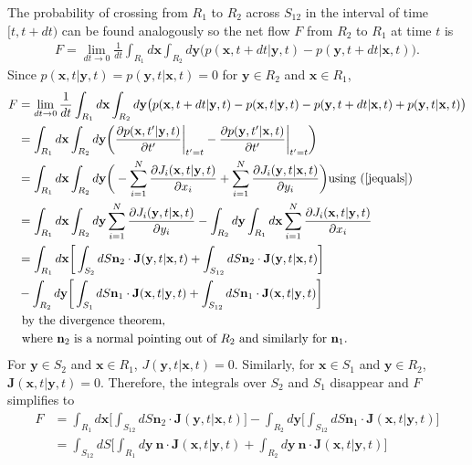 \documentclass{article}
\newcommand{\mb}{\mathbf}
\begin{document}
\begin{pf}
The probability of crossing from $R_1$ to $R_2$ across $S_{12}$  in the interval of time $[t,t+dt)$ can be found analogously so the net flow $F$ from $R_2$ to $R_1$ at time $t$ is 
\begin{align*}
F=\lim_{dt \to 0}\frac{1}{dt}\int_{R_1}d{\mb x}\int_{R_2}d{\mb y} \big(p({\mb x},t+dt|{\mb y},t)-p({\mb y},t+dt|{\mb x},t)\big).
\end{align*}
Since $p({\mb x},t|{\mb y},t)=p({\mb y},t|{\mb x},t)=0$ for ${\mb y}\in R_2$ and ${\mb x}\in R_1$,
\begin{align*}
F&=\lim_{dt \to 0}\frac{1}{dt}\int_{R_1}d{\mb x}\int_{R_2}d{\mb y} \big(p({\mb x},t+dt|{\mb y},t)-p({\mb x},t|{\mb y},t)-p({\mb y},t+dt|{\mb x},t)+p({\mb y},t|{\mb x},t)\big)
\\&=\int_{R_1}d{\mb x}\int_{R_2}d{\mb y} \bigg(\frac{\partial p({\mb x},t'|{\mb y},t)}{\partial t'}\bigg|_{t'=t}-\frac{\partial p({\mb y},t'|{\mb x},t)}{\partial t'}\bigg|_{t'=t}\bigg)
\\&=\int_{R_1}d{\mb x}\int_{R_2}d{\mb y}\bigg(-\sum_{i=1}^N\frac{\partial J_i({\mb x},t|{\mb y},t)}{\partial x_i}+\sum_{i=1}^N\frac{\partial J_i({\mb y},t|{\mb x},t)}{\partial y_i}\bigg) \text{using (\ref{jequals})}
\\&=\int_{R_1}d{\mb x}\int_{R_2}d{\mb y}\sum_{i=1}^N\frac{\partial J_i({\mb y},t|{\mb x},t)}{\partial y_i}-\int_{R_2}d{\mb y}\int_{R_1}d{\mb x}\sum_{i=1}^N\frac{\partial J_i({\mb x},t|{\mb y},t)}{\partial x_i}
\\&=\int_{R_1}d{\mb x}\bigg[\int_{S_2}dS {\mb n_2}\cdot {\mb J}({\mb y},t|{\mb x},t)+\int_{S_{12}}dS {\mb n_2}\cdot {\mb J}({\mb y},t|{\mb x},t)\bigg]\\&-\int_{R_2}d{\mb y}\bigg[\int_{S_1}dS{\mb n}_1\cdot{\mb J}({\mb x},t|{\mb y},t)+\int_{S_{12}}dS{\mb n}_1\cdot{\mb J}({\mb x},t|{\mb y},t)\bigg]
\\&\text{ by the divergence theorem,}
\\ &\text{ where ${\mb n}_2$ is a normal pointing out of $R_2$ and similarly for ${\mb n}_1$.}
\end{align*}
For ${\mb y}\in S_2$ and ${\mb x}\in R_1$, $J({\mb y},t|{\mb x},t)=0$. Similarly, for ${\mb x}\in S_1$ and ${\mb y}\in R_2$, ${\mb J}({\mb x},t|{\mb y},t)=0$.  Therefore, the integrals over $S_2$ and $S_1$ disappear and $F$ simplifies to
\begin{align*}
F&=\int_{R_1}d{\mb x}\bigg[\int_{S_{12}}dS {\mb n_2}\cdot {\mb J}({\mb y},t|{\mb x},t)\bigg]-\int_{R_2}d{\mb y}\bigg[\int_{S_{12}}dS{\mb n}_1\cdot{\mb J}({\mb x},t|{\mb y},t)\bigg]
\\&=\int_{S_{12}}dS\bigg[\int_{R_1}d{\mb y}\ {\mb n}\cdot \mb{J}({\mb x},t|{\mb y},t)+\int_{R_2}d{\mb y}\ {\mb n}\cdot {\mb J}({\mb x},t|{\mb y},t)\bigg]

\end{align*}
\end{pf}
\end{document}
